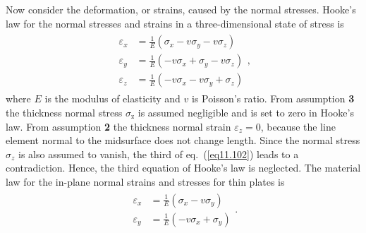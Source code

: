 \documentclass{AeroStructure-ERJohnson}
\begin{document}
Now consider the deformation, or strains, caused by the normal stresses. Hooke's law for the normal stresses and strains in a three-dimensional state of stress\vspace*{-3pt} is
\begin{align}\label{eq11.102}
\begin{aligned} \varepsilon_{x} &=\frac{1}{E}\left(\sigma_{x}-v \sigma_{y}-v \sigma_{z}\right) \\ \varepsilon_{y} &=\frac{1}{E}\left(-v \sigma_{x}+\sigma_{y}-v \sigma_{z}\right) \\ \varepsilon_{z} &=\frac{1}{E}\left(-v \sigma_{x}-v \sigma_{y}+\sigma_{z}\right) \end{aligned},
\end{align}
where $E$ is the modulus of elasticity and $v$ is Poisson's ratio. From assumption \textbf{3} the thickness normal stress $\sigma_{\textrm{z}}$ is assumed negligible and is set to zero in Hooke's law. From assumption \textbf{2} the thickness normal strain $\varepsilon_{z}=0$, because the line element normal to the midsurface does not change length. Since the normal stress $\sigma_{z}$ is also assumed to vanish, the third of eq.~(\ref{eq11.102}) leads to a contradiction. Hence, the third equation of Hooke's law is neglected. The material law for the in-plane normal strains and stresses for thin plates\vspace*{-3pt} is
\begin{align}\label{eq11.103}
\begin{aligned} \varepsilon_{x} &=\frac{1}{E}\left(\sigma_{x}-v \sigma_{y}\right) \\ \varepsilon_{y} &=\frac{1}{E}\left(-v \sigma_{x}+\sigma_{y}\right)\end{aligned}.
\end{align}

\vspace*{-1pc}
\end{document}
